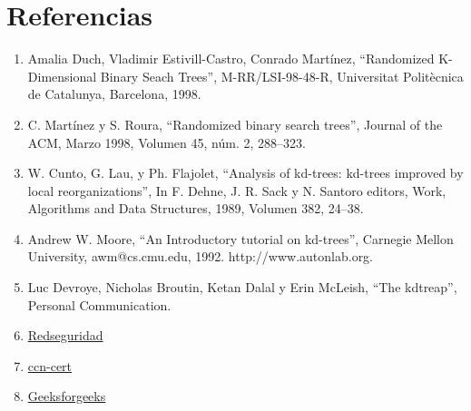 \documentclass{article}
\begin{document}
\section{Referencias}
\begin{enumerate}
	\item Amalia Duch, Vladimir Estivill-Castro, Conrado Martínez, “Randomized K-Dimensional Binary Seach Trees”, M-RR/LSI-98-48-R, Universitat Politècnica de Catalunya, Barcelona, 1998.
	\item C. Martínez y S. Roura, “Randomized binary search trees”, Journal of the ACM, Marzo 1998, Volumen 45, núm. 2, 288$–$323.
	\item W. Cunto, G. Lau, y Ph. Flajolet, “Analysis of kd-trees: kd-trees improved by local reorganizations”, In F. Dehne, J. R. Sack y N. Santoro editors, Work, Algorithms and Data Structures, 1989, Volumen 382, 24$–$38.
	\item Andrew W. Moore, “An Introductory tutorial on kd-trees”, Carnegie Mellon University, awm@cs.cmu.edu, 1992. http://www.autonlab.org.
	\item Luc Devroye, Nicholas Broutin, Ketan Dalal y Erin McLeish, “The kdtreap”, Personal Communication.
	\item \href{https://www.redseguridad.com/revistas/red/095/58/index.html}{Redseguridad}
	\item \href{https://www.ccn-cert.cni.es/informes/informes-ccn-cert-publicos/5377-ccn-cert-ia-13-20-ciberamenazas-y-tendencias-edicion-2020/file.html}{ccn-cert}
	\item \href{https://www.geeksforgeeks.org/}{Geeksforgeeks}
\end{enumerate}
\end{document}
